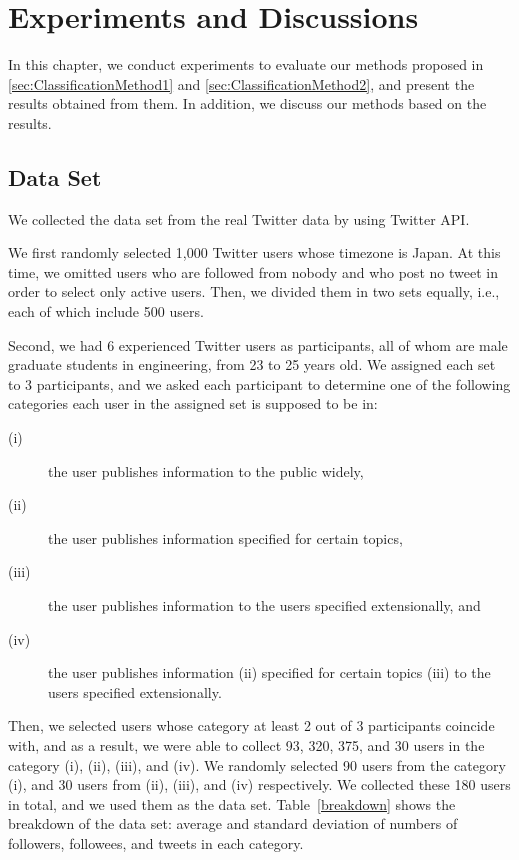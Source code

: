 \section{Experiments and Discussions}
\label{sec:Experiment}

In this chapter, we conduct experiments to evaluate our methods proposed
in \ref{sec:ClassificationMethod1} and \ref{sec:ClassificationMethod2},
and present the results obtained from them.  In addition, we discuss our
methods based on the results.

\subsection{Data Set}
\label{subsec:Data Set}

We collected the data set from the real Twitter data by using Twitter
API.

We first randomly selected 1,000 Twitter users whose timezone is Japan.
At this time, we omitted users who are followed from nobody and who post
no tweet in order to select only active users.  Then, we divided them in
two sets equally, i.e., each of which include 500 users.

Second, we had 6 experienced Twitter users as participants, all of whom
are male graduate students in engineering, from 23 to 25 years old.  We
assigned each set to 3 participants, and we asked each participant to
determine one of the following categories each user in the assigned set
is supposed to be in:

\begin{description}
\item[(i)] the user publishes information to the public widely,
\item[(ii)] the user publishes information specified for certain topics,
\item[(iii)] the user publishes information to the users specified
           extensionally, and
\item[(iv)] the user publishes information (ii) specified for certain
           topics (iii) to the users specified extensionally.
\end{description}


Then, we selected users whose category at least 2 out of 3 participants
coincide with, and as a result, we were able to collect 93, 320, 375,
and 30 users in the category (i), (ii), (iii), and (iv).  We randomly
selected 90 users from the category (i), and 30 users from (ii), (iii),
and (iv) respectively.  We collected these 180 users in total, and we
used them as the data set.  Table~\ref{breakdown} shows the breakdown of
the data set: average and standard deviation of numbers of followers,
 followees, and tweets in each category.

